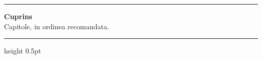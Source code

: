 \documentclass[11pt,a4paper]{article}
\begin{document}
\noindent\begin{minipage}{0.04\linewidth}\color{themePrereq}\rule{4pt}{2.6em}\end{minipage}%
\begin{minipage}{0.94\linewidth}
  {\sffamily\fontsize{30}{34}\selectfont\textbf{\color{themeText}Cuprins}}\\[4pt]
  {\sffamily\large\color{black!55}Capitole, in ordinea recomandata.}
\end{minipage}
\par\vspace{14pt}
{\color{themePrereq!40}\hrule height 0.5pt}
\par\vspace{20pt}

\begingroup
\renewcommand{\baselinestretch}{1.4}\selectfont
\makeatletter
{}
\makeatother
\endgroup









\end{document}
